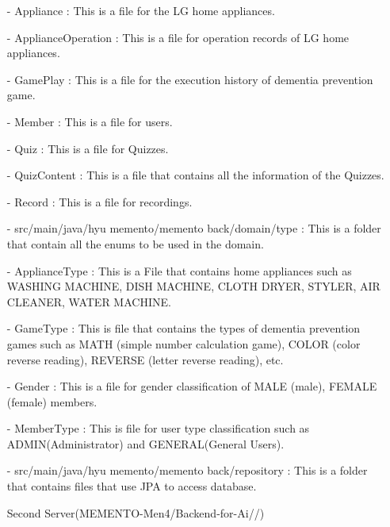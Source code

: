 \documentclass[conference]{IEEEtran}
\begin{document}
\begin{enumerate}
        \item [-] Appliance : This is a file for the LG home appliances.\\
        \item [-] ApplianceOperation : This is a file for operation records of LG home appliances.\\
        \item [-] GamePlay : This is a file for the execution history of dementia prevention game.\\
        \item [-] Member : This is a file for users.\\
        \item [-] Quiz : This is a file for Quizzes.\\
        \item [-] QuizContent : This is a file that contains all the information of the Quizzes.\\
        \item [-] Record : This is a file for recordings.\\
        \item [-] src/main/java/hyu memento/memento back/domain/type : This is a folder that contain all the enums to be used in the domain.\\
        \item [-] ApplianceType : This is a File that contains home appliances such as WASHING MACHINE, DISH MACHINE, CLOTH DRYER, STYLER, AIR CLEANER, WATER MACHINE.\\
        \item [-] GameType : This is file that contains the types of dementia prevention games such as MATH (simple number calculation game), COLOR (color reverse reading), REVERSE (letter reverse reading), etc.\\
        \item [-] Gender : This is a file for gender classification of MALE (male), FEMALE (female) members.\\
        \item [-] MemberType : This is file for user type classification such as ADMIN(Administrator) and GENERAL(General Users).\\
        \item [-] src/main/java/hyu memento/memento back/repository : This is a folder that contains files that use JPA to access database.\\
        \item[] Second Server(MEMENTO-Men4/Backend-for-Ai//)\\

\end{enumerate}
\end{document}
